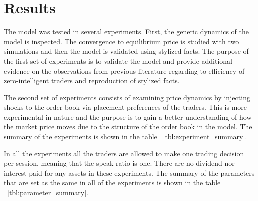 
\section{Results}

The model was tested in several experiments. First, the generic dynamics of 
the model is inspected. The convergence to equilibrium price is studied with two
simulations and then the model is validated using stylized facts. 
The purpose of the first set of experiments is to validate the model and provide additional evidence 
on the observations from previous literature regarding to efficiency of zero-intelligent traders and 
reproduction of stylized facts.

The second set of experiments consists of examining price dynamics by injecting shocks to the order book via placement 
preferences of the traders. This is more experimental in nature and the purpose is to gain a better understanding of 
how the market price moves due to the structure of the order book in the model. The summary of the experiments is 
shown in the table ~\ref{tbl:experiment_summary}.



In all the experiments all the traders are allowed 
to make one trading decision per session, meaning that the speak ratio 
is one. There are no dividend nor interest paid for any assets in these experiments.
The summary of the parameters that are set as the same in all of the experiments 
is shown in the table ~\ref{tbl:parameter_summary}.



